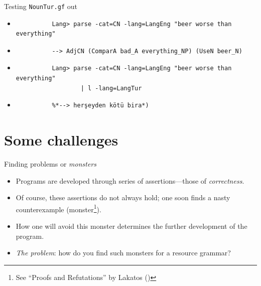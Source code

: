 \documentclass{beamer}
\begin{document}
  \begin{frame}[fragile]{Testing \texttt{NounTur.gf} out}
    \begin{itemize}
      \item<1->
        \begin{lstlisting}
          Lang> parse -cat=CN -lang=LangEng "beer worse than everything"
        \end{lstlisting}
      \item<2->
        \begin{lstlisting}
          --> AdjCN (ComparA bad_A everything_NP) (UseN beer_N)
        \end{lstlisting}
      \item<3->
        \begin{lstlisting}
          Lang> parse -cat=CN -lang=LangEng "beer worse than everything"
                  | l -lang=LangTur
        \end{lstlisting}
      \item<4->
        \begin{lstlisting}
          %*--> herşeyden kötü bira*)
        \end{lstlisting}
    \end{itemize}
  \end{frame}

  \section{Some challenges}

  \begin{frame}{Finding problems or \emph{monsters}}
    \begin{itemize}
      \item<1-> Programs are developed through series of assertions---those
        of \emph{correctness}.
      \item<2-> Of course, these assertions do not always hold; one soon finds a
        nasty counterexample (monster\footnote{See ``Proofs and Refutations''
        by Lakatos (\cite{lakatos1976proofs})}).
      \item<3-> How one will avoid this monster determines the further
        development of the program.
      \item<4-> \emph{The problem}: how do you find such monsters for a resource
        grammar?
    \end{itemize}
  \end{frame}
\end{document}
